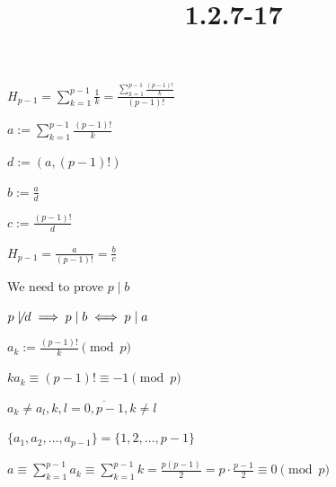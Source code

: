 \documentclass{article}
\title{1.2.7-17}
\begin{document}
\maketitle

\( H_{p-1} = \sum_{k=1}^{p-1}\frac{1}{k} = \frac{\sum_{k=1}^{p-1}\frac{(p-1)!}{k}}{(p-1)!} \)

\( a := \sum_{k=1}^{p-1}\frac{(p-1)!}{k} \)

\( d := (a, (p-1)!) \)

\( b := \frac{a}{d} \)

\( c := \frac{(p-1)!}{d} \)

\( H_{p-1} = \frac{a}{(p-1)!} = \frac{b}{c} \)

We need to prove \( p \mid b \)

\( p \not\mid d \implies p \mid b \iff p \mid a \)

\( a_k := \frac{(p-1)!}{k} \pmod p \)

\( k a_k \equiv (p-1)! \equiv -1 \pmod p \)

\( a_k \neq a_l, k,l=\overline{0,p-1}, k \neq l \)

\( \{ a_1, a_2, \ldots, a_{p-1} \} = \{ 1,2,\ldots, p - 1\} \)

\( a \equiv \sum_{k=1}^{p-1} a_k \equiv \sum_{k=1}^{p-1} k = \frac{p(p-1)}{2} = p \cdot \frac{p-1}{2} \equiv 0 \pmod p \)
\end{document}
